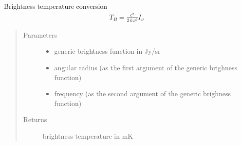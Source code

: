 \documentclass[letterpaper,10pt,english]{sphinxmanual}
\begin{document}
\begin{fulllineitems}
\label{\detokenize{diffsph.utils:diffsph.utils.tools.TB}}
\sphinxAtStartPar
Brightness temperature conversion
\begin{equation*}
\begin{split}T_B = \frac{c^2}{2\,k\,\nu^2}I_\nu\end{split}
\end{equation*}\begin{quote}\begin{description}
\item[{Parameters}] \leavevmode\begin{itemize}
\item {} 
\sphinxAtStartPar
{} \textendash{} generic brightness function in Jy/sr

\item {} 
\sphinxAtStartPar
{} \textendash{} angular radius (as the first argument of the generic brighness function)

\item {} 
\sphinxAtStartPar
{} \textendash{} frequency (as the second argument of the generic brighness function)

\end{itemize}

\item[{Returns}] \leavevmode
\sphinxAtStartPar
brightness temperature in mK

\end{description}\end{quote}

\end{fulllineitems}

\end{document}
